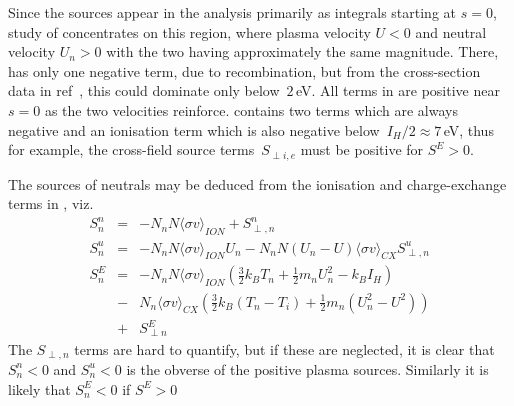 Since the sources appear in the analysis primarily as integrals starting at $s=0$,
study of  concentrates on this region, where plasma velocity $U<0$ and neutral velocity $U_n>0$
with the two having approximately the same magnitude. There,  has only one negative
term, due to recombination, but from the cross-section data in ref~\cite{Ha13Benc}, this could
dominate only below~$2$\,eV. All terms in  are positive near $s=0$ as the two velocities
reinforce.  contains two terms which are always negative and an ionisation
term which is also negative below~$I_H/2\approx7$\,eV, thus for example, the cross-field source
terms~$S_{\perp i,e}$  must be positive for $S^E>0$.

The sources of neutrals may be deduced from the ionisation and charge-exchange terms in , viz.
\begin{eqnarray}
\label{eq:Snn} S^n_n&=&-N_n N \langle\sigma v\rangle_{ION} +S^n_{\perp,n} \\
\label{eq:Sun} S^u_n&=&-N_n N \langle\sigma v\rangle_{ION} U_n - N_n N (U_n-U) \langle\sigma v\rangle_{CX} S^u_{\perp,n}\\
\label{eq:SEn} S^E_n&=&
-N_n N \langle\sigma v\rangle_{ION} (\frac{3}{2} k_B T_n + \frac{1}{2} m_n U_n^2 -k_B I_H)\\
&-&N_n \langle\sigma v\rangle_{CX} \left(\frac{3}{2} k_B (T_n-T_i)  + \frac{1}{2} m_n (U_n^2-U^2)\right)\\
&+&S^E_{\perp n} 
\end{eqnarray}
The $S_{\perp,n}$ terms are hard to quantify, but if these are neglected,
it is clear that $S^n_n<0$ and $S^u_n<0$
is the obverse of the positive plasma sources. Similarly it is likely that $S^E_n<0$ if $S^E>0$

